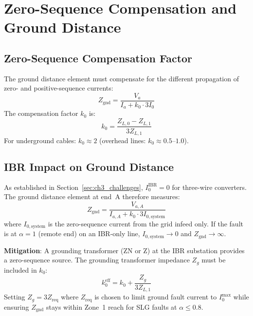 \section{Zero-Sequence Compensation and Ground Distance}
\label{sec:ch5_ground_distance}

\subsection{Zero-Sequence Compensation Factor}

The ground distance element must compensate for the different propagation
of zero- and positive-sequence currents:
\begin{equation}
  Z_\mathrm{gnd} = \frac{V_a}{I_a + k_0 \cdot 3I_0}
  \label{eq:ch5_znd_comp}
\end{equation}
The compensation factor $k_0$ is:
\begin{equation}
  k_0 = \frac{Z_{L,0} - Z_{L,1}}{3 Z_{L,1}}
  \label{eq:ch5_k0}
\end{equation}
For underground cables: $k_0 \approx 2$ (overhead lines: $k_0 \approx 0.5$--$1.0$).

\subsection{IBR Impact on Ground Distance}

As established in Section~\ref{sec:ch3_challenges}, $I_0^\mathrm{IBR} = 0$
for three-wire converters. The ground distance element at end~A therefore
measures:
\begin{equation}
  Z_\mathrm{gnd} = \frac{V_{a,A}}{I_{a,A} + k_0 \cdot 3I_{0,\mathrm{system}}}
  \label{eq:ch5_znd_ibr}
\end{equation}
where $I_{0,\mathrm{system}}$ is the zero-sequence current from the
grid infeed only. If the fault is at $\alpha = 1$ (remote end) on an
IBR-only line, $I_{0,\mathrm{system}} \to 0$ and $Z_\mathrm{gnd} \to \infty$.

\textbf{Mitigation}: A grounding transformer (ZN or Z) at the IBR substation
provides a zero-sequence source. The grounding transformer impedance
$Z_{g}$ must be included in $k_0$:
\begin{equation}
  k_0^\mathrm{eff} = k_0 + \frac{Z_g}{3 Z_{L,1}}
  \label{eq:ch5_k0_eff}
\end{equation}
Setting $Z_g = 3Z_\mathrm{req}$ where $Z_\mathrm{req}$ is chosen to limit
ground fault current to $I_0^\mathrm{max}$ while ensuring $Z_\mathrm{gnd}$
stays within Zone~1 reach for SLG faults at $\alpha \leq 0.8$.

